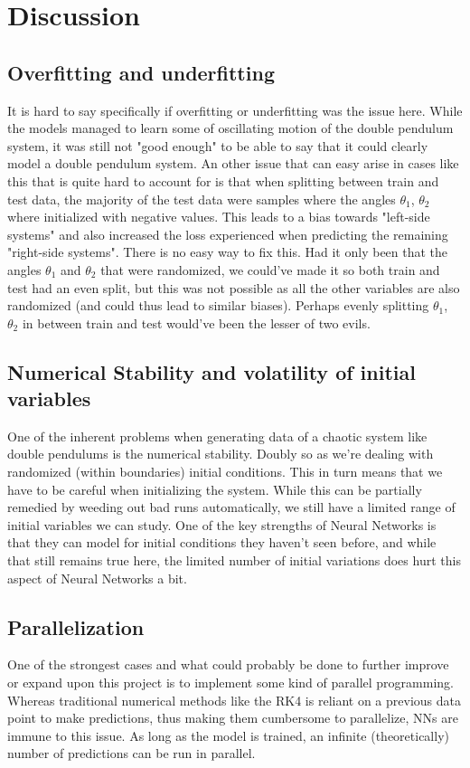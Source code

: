 \documentclass{article}
\begin{document}
\section{Discussion}
\subsection{Overfitting and underfitting}
It is hard to say specifically if overfitting or underfitting was the issue here. While the models managed to learn some of oscillating motion of the double pendulum system, it was still not "good enough" to be able to say that it could clearly model a double pendulum system. An other issue that can easy arise in cases like this that is quite hard to account for is that when splitting between train and test data, the majority of the test data were samples where the angles $\theta_1$, $\theta_2$ where initialized with negative values. This leads to a bias towards "left-side systems" and also increased the loss experienced when predicting the remaining "right-side systems". There is no easy way to fix this. Had it only been that the angles $\theta_1$ and $\theta_2$ that were randomized, we could've made it so both train and test had an even split, but this was not possible as all the other variables are also randomized (and could thus lead to similar biases). Perhaps evenly splitting $\theta_1$, $\theta_2$ in between train and test would've been the lesser of two evils.
\subsection{Numerical Stability and volatility of initial variables}
One of the inherent problems when generating data of a chaotic system like double pendulums is the numerical stability. Doubly so as we're dealing with randomized (within boundaries) initial conditions. This in turn means that we have to be careful when initializing the system. While this can be partially remedied by weeding out bad runs automatically, we still have a limited range of initial variables we can study. One of the key strengths of Neural Networks is that they can model for initial conditions they haven't seen before, and while that still remains true here, the limited number of initial variations does hurt this aspect of Neural Networks a bit.
\subsection{Parallelization}
One of the strongest cases and what could probably be done to further improve or expand upon this project is to implement some kind of parallel programming. Whereas traditional numerical methods like the RK4 is reliant on a previous data point to make predictions, thus making them cumbersome to parallelize, NNs are immune to this issue. As long as the model is trained, an infinite (theoretically) number of predictions can be run in parallel.
\newpage
\end{document}
